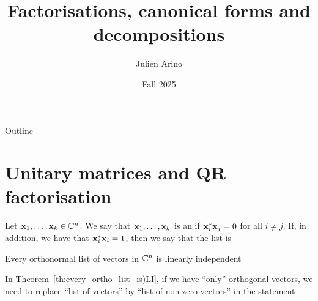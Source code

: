 \documentclass[aspectratio=169]{beamer}
\title{Factorisations, canonical forms and decompositions}
\author{Julien Arino}
\date{Fall 2025}
\begin{document}
\begin{frame}
	\titlepage
\end{frame}
\addtocounter{page}{-1}
  
  
\begin{frame}{Outline}
	  \tableofcontents[hideallsubsections]
\end{frame}
\addtocounter{page}{-1}


\section{Unitary matrices and QR factorisation}

\begin{frame}
\begin{definition}
Let $\mathbf{x}_1, \ldots, \mathbf{x}_k\in \mathbb{C}^n$. We say that $\mathbf{x}_1, \ldots, \mathbf{x}_k$ is an  if $\mathbf{x}_i^*\mathbf{x}_j=0$ for all $i \neq j$. If, in addition, we have that $\mathbf{x}_i^*\mathbf{x}_i=1$, then we say that the list is 
\end{definition}
\vfill
\begin{theorem}\label{th:every_ortho_list_is)LI}
Every orthonormal list of vectors in $\mathbb{C}^n$ is linearly independent
\end{theorem}
\vfill
\begin{remark}
In Theorem~\ref{th:every_ortho_list_is)LI}, if we have ``only'' orthogonal vectors, we need to replace ``list of vectors'' by ``list of non-zero vectors'' in the statement 
\end{remark}
\end{frame}
\end{document}
